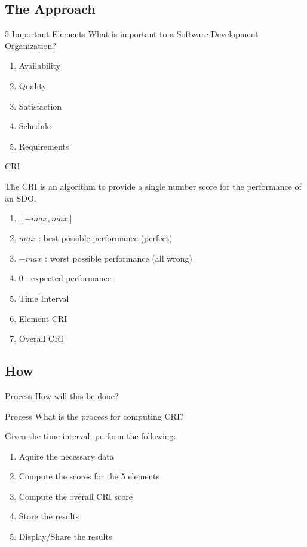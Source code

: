 \subsection{The Approach}

\begin{frame}{5 Important Elements}
    What is important to a Software Development Organization?
    
    \begin{enumerate}
        \item Availability 
        \item Quality
        \item Satisfaction
        \item Schedule
        \item Requirements
    \end{enumerate}
\end{frame}

\begin{frame}{CRI}
    \begin{displayquote}
    The CRI is an algorithm to provide a single number score
    for the performance of an SDO.
    \end{displayquote}
    
    \begin{enumerate}
        \item $[-max, max]$
        \item $max$ : best possible performance (perfect)
        \item $-max$ : worst possible performance (all wrong)
        \item $0$ : expected performance
        \item Time Interval
        \item Element CRI
        \item Overall CRI
    \end{enumerate}
\end{frame}

\subsection{How}

\begin{frame}{Process}
    How will this be done?
\end{frame}

\begin{frame}{Process}
    What is the process for computing CRI?
    
    Given the time interval, perform the following:
    
    \begin{enumerate}
        \item Aquire the necessary data
        \item Compute the scores for the 5 elements
        \item Compute the overall CRI score
        \item Store the results
        \item Display/Share the results
    \end{enumerate}
\end{frame}

